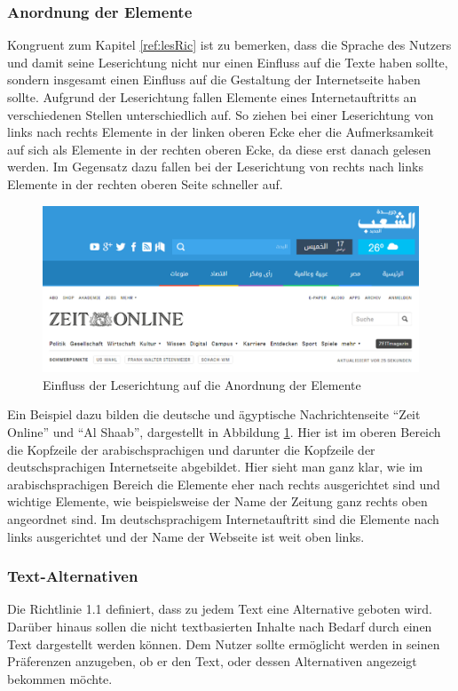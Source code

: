 \documentclass[12pt, paper=a4, bibtotoc, toc=listof, headsepline=true]{scrreprt}
\begin{document}
			\subsubsection{Anordnung der Elemente}
			Kongruent zum Kapitel \ref{ref:lesRic} ist zu bemerken, dass die Sprache des Nutzers und damit seine Leserichtung nicht nur einen Einfluss auf die Texte haben sollte, sondern insgesamt einen Einfluss auf die Gestaltung der Internetseite haben sollte. Aufgrund der Leserichtung fallen Elemente eines Internetauftritts an verschiedenen Stellen unterschiedlich auf. So ziehen bei einer Leserichtung von links nach rechts Elemente in der linken oberen Ecke eher die Aufmerksamkeit auf sich als Elemente in der rechten oberen Ecke, da diese erst danach gelesen werden. Im Gegensatz dazu fallen bei der Leserichtung von rechts nach links Elemente in der rechten oberen Seite schneller auf\cite[S.47 f.]{meidl2013global}.
			\begin{figure}
				\centering
				\includegraphics[width=\textwidth,height=\textheight,keepaspectratio]{leserichtung.png}
				\caption[Einfluss der Leserichtung auf Anordnung der Elemente]{Einfluss der Leserichtung auf die Anordnung der Elemente\cite{elShaab}\cite{zeitOnline}}
				\label{img:lesRic}
			\end{figure}
			Ein Beispiel dazu bilden die deutsche und ägyptische Nachrichtenseite \enquote{Zeit Online} und \enquote{Al Shaab}, dargestellt in Abbildung  \ref{img:lesRic}. Hier ist im oberen Bereich die Kopfzeile der arabischsprachigen und darunter die Kopfzeile der deutschsprachigen Internetseite abgebildet. Hier sieht man ganz klar, wie im arabischsprachigen Bereich die Elemente eher nach rechts ausgerichtet sind und wichtige Elemente, wie beispielsweise der Name der Zeitung ganz rechts oben angeordnet sind. Im deutschsprachigem Internetauftritt sind die Elemente nach links ausgerichtet und der Name der Webseite ist weit oben links.
			\subsubsection{Text-Alternativen}
			Die Richtlinie 1.1 definiert, dass zu jedem Text eine Alternative geboten wird. Darüber hinaus sollen die nicht textbasierten Inhalte nach Bedarf durch einen Text dargestellt werden können. Dem Nutzer sollte ermöglicht werden in seinen Präferenzen anzugeben, ob er den Text, oder dessen Alternativen angezeigt bekommen möchte.
\end{document}
